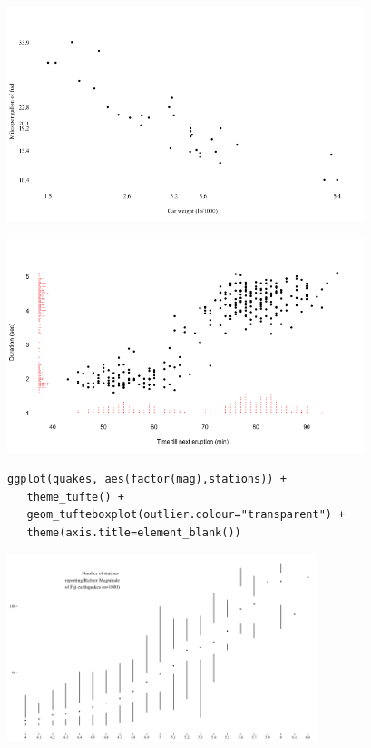 \documentclass[xcolor=table,aspectratio=169]{beamer}
\begin{document}
\begin{frame}
  \includegraphics[width=0.78\textwidth]{pics/tufte-scatter.png}
\end{frame}

\begin{frame}
  \includegraphics[width=0.78\textwidth]{pics/tufte-scatter2.png}
\end{frame}

\begin{frame}[fragile]
  \begin{footnotesize}
\begin{verbatim}
ggplot(quakes, aes(factor(mag),stations)) + 
   theme_tufte() +
   geom_tufteboxplot(outlier.colour="transparent") + 
   theme(axis.title=element_blank())
\end{verbatim}
  \end{footnotesize}
  \includegraphics[width=0.68\textwidth]{pics/tufte-box.png}
\end{frame}
\end{document}

